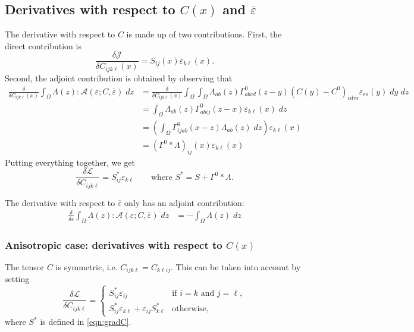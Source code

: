 \documentclass[11pt]{article}
\begin{document}
\subsection{Derivatives with respect to $C(x)$ and $\overline{\varepsilon}$}
The derivative with respect to $C$ is made up of two contributions. First, the direct contribution is
\begin{equation}
\frac{\delta \mathcal{J}}{\delta C_{ijk\ell}(x)} = S_{ij}(x)\varepsilon_{k\ell}(x).
\end{equation}
Second, the adjoint contribution is obtained by observing that
\begin{equation}
    \begin{aligned}
    \frac{\delta }{\delta C_{ijk\ell}(x)} \int_\Omega \Lambda(z) : \mathcal{A}(\varepsilon;C,\overline{\varepsilon})\;dz &=\frac{\delta }{\delta C_{ijk\ell}(x)} \int_\Omega\int_\Omega \Lambda_{ab}(z)\Gamma^0_{abcd}(z-y)\left(C(y)-C^0\right)_{cdrs}\varepsilon_{rs}(y)\;dy\;dz\\
    &= \int_\Omega \Lambda_{ab}(z)\Gamma^0_{abij}(z-x)\varepsilon_{k\ell}(x)\;dz\\
    &= \left(\int_\Omega\Gamma^0_{ijab}(x-z)\Lambda_{ab}(z)\;dz\right)\varepsilon_{k\ell}(x)\\
    &= \left(\Gamma^0*\Lambda\right)_{ij}(x)\varepsilon_{k\ell}(x)
    \end{aligned}
\end{equation}
Putting everything together, we get
\begin{equation}
\frac{\delta \mathcal{L}}{\delta C_{ijk\ell}} = S^*_{ij}\varepsilon_{k\ell}
\qquad\text{where $S^* = S+\Gamma^0*\Lambda$.}
\label{eqn:gradC}
\end{equation}

The derivative with respect to $\overline{\varepsilon}$ only has an adjoint contribution:
\begin{equation}
    \begin{aligned}
    \frac{\delta}{\delta \overline{\varepsilon}} \int_\Omega \Lambda(z) : \mathcal{A}(\varepsilon;C,\overline{\varepsilon})\;dz &= -\int_\Omega \Lambda(z) \;dz
    \end{aligned}
\end{equation}
\subsubsection{Anisotropic case: derivatives with respect to $C(x)$}
The tensor $C$ is symmetric, i.e. $C_{ijk\ell} = C_{k\ell ij}$. This can be taken into account by setting
\begin{equation}
\frac{\delta \mathcal{L}}{\delta C_{ijk\ell}} =\begin{cases} S^*_{ij}\varepsilon_{ij} & \text{if $i=k$ and $j=\ell$}, \\
    S^*_{ij}\varepsilon_{k\ell} + \varepsilon_{ij}S^*_{k\ell}& \text{otherwise},
\end{cases}
\end{equation}
where $S^*$ is defined in \eqref{eqn:gradC}.
\end{document}
